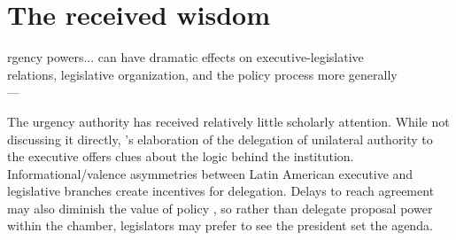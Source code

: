 \documentclass[letter,12pt]{article}
\begin{document}
\section{The received wisdom}

\begin{center}
\singlespacing
[U]rgency powers... can have dramatic effects on executive-legislative \\ 
relations, legislative organization, and the policy process more generally\\ 
---\citet[][:438]{morgenstern.2002b}
\end{center}
\onehalfspacing


\noindent The urgency authority has received relatively little scholarly attention. While not discussing it directly, \citeauthor{carey.shugart.1998a}'s \citeyearpar{carey.shugart.1998a} elaboration of the delegation of unilateral authority to the executive offers clues about the logic behind the institution. Informational/valence asymmetries between Latin American executive and legislative branches \citep{londregan.2000a} create incentives for delegation. Delays to reach agreement may also diminish the value of policy \citep{baron.ferejohn.1989}, so rather than delegate proposal power within the chamber, legislators may prefer to see the president set the agenda. 

\end{document}
